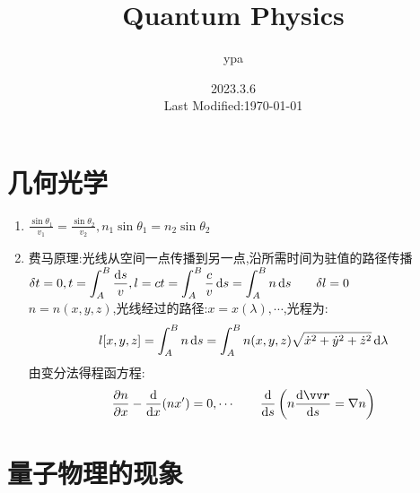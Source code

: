 \documentclass{article}
\title{Quantum Physics}
\author{ypa}
\date{2023.3.6\\
Last Modified:\today
}
\begin{document}
\maketitle
\tableofcontents

\setcounter{section}{-1}
\section{几何光学}
\begin{enumerate}[label=\arabic*]
	\item $\frac{\sin\theta_1}{v_1}=\frac{\sin \theta_2}{v_2},n_1\sin \theta_1=n_2\sin \theta_2$
	\item 费马原理:光线从空间一点传播到另一点,沿所需{\red 时间为驻值}的路径传播\\
				$\displaystyle \delta t=0,t=\int_{A}^{B}\frac{\mathop{}\!\mathrm{d} s}{v},l=ct=\int_{A}^{B} \frac{c}{v}\mathop{}\!\mathrm{d} s=\int_{A}^{B}n\mathop{}\!\mathrm{d} s\qquad \delta l=0$\\
				$n=n(x,y,z)$,光线经过的路径:$x=x(\lambda),\cdots $,光程为:
				\[l[x,y,z]=\int_{A}^{B}n\mathop{}\!\mathrm{d} s=\int_{A}^{B}n(x,y,z)\sqrt{\dot{x}^2+\dot{y}^2+\dot{z}^2}\mathop{}\!\mathrm{d} \lambda\]
				由变分法得程函方程:\[\frac{\partial n}{\partial x}-\frac{\dif }{\dif x}(nx')=0,\cdots \qquad \frac{\dif }{\dif s}\left(n\frac{\dif \vec{r}}{\dif s}=\nabla n\right)\]
\end{enumerate}

\section{量子物理的现象}
\end{document}
